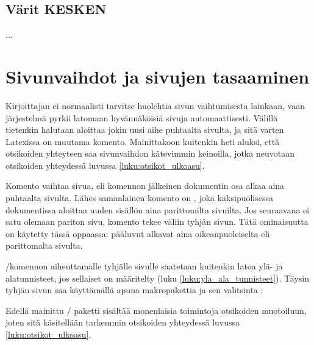 \begin{koodilohkosis}
  \newcommand{\sposti}[1]{\href{mailto:#1}{\nolinkurl{#1}}}
\end{koodilohkosis}

\subsection{Värit KESKEN}

...

\section{Sivunvaihdot ja sivujen tasaaminen}
\label{luku:sivunvaihdot}

Kirjoittajan ei normaalisti tarvitse huolehtia sivun vaihtumisesta
lainkaan, vaan järjestelmä pyrkii latomaan hyvännäköisiä sivuja
automaattisesti. Välillä tietenkin halutaan aloittaa jokin uusi aihe
puhtaalta sivulta, ja sitä varten Latexissa on muutama komento.
Mainittakoon kuitenkin heti aluksi, että otsikoiden yhteyteen saa
sivunvaihdon kätevimmin keinoilla, jotka neuvotaan otsikoiden yhteydessä
luvussa \ref{luku:otsikot_ulkoasu}.

Komento  vaihtaa sivua, eli komennon jälkeinen
dokumentin osa alkaa aina puhtaalta sivulta. Lähes samanlainen komento
on , joka kaksipuolisessa dokumentissa
aloittaa uuden sisällön aina parittomilta sivuilta. Jos seuraavana ei
satu olemaan pariton sivu, komento tekee väliin tyhjän sivun. Tätä
ominaisuutta on käytetty tässä oppaassa: pääluvut alkavat aina
oikeanpuoleiselta eli parittomalta sivulta.

\-/komennon aiheuttamalle tyhjälle sivulle
saatetaan kuitenkin latoa ylä- ja alatunnisteet, jos sellaiset on
määritelty (luku \ref{luku:yla_ala_tunnisteet}). Täysin tyhjän sivun saa
käyttämällä apuna makropakettia  ja
sen valitsinta :

\begin{koodilohkosis}
  \usepackage[clearempty]{titlesec}
\end{koodilohkosis}

Edellä mainittu \-/ paketti sisältää monenlaisia
toimintoja otsikoiden muotoiluun, joten sitä käsitellään tarkemmin
otsikoiden yhteydessä luvussa \ref{luku:otsikot_ulkoasu}.

